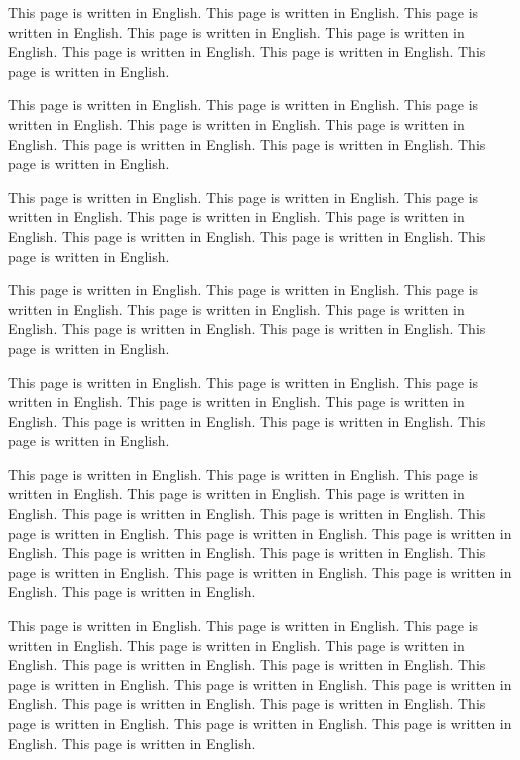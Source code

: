 \documentclass[12pt]{article} %
\begin{document}
This page is written in English. This page is written in English. 
This page is written in English. This page is written in English. 
This page is written in English. This page is written in English. 
This page is written in English. This page is written in English. 

This page is written in English. This page is written in English. 
This page is written in English. This page is written in English. 
This page is written in English. This page is written in English. 
This page is written in English. This page is written in English. 

This page is written in English. This page is written in English. 
This page is written in English. This page is written in English. 
This page is written in English. This page is written in English. 
This page is written in English. This page is written in English. 

This page is written in English. This page is written in English. 
This page is written in English. This page is written in English. 
This page is written in English. This page is written in English. 
This page is written in English. This page is written in English. 

This page is written in English. This page is written in English. 
This page is written in English. This page is written in English. 
This page is written in English. This page is written in English. 
This page is written in English. This page is written in English. 

This page is written in English. This page is written in English. 
This page is written in English. This page is written in English. 
This page is written in English. This page is written in English. 
This page is written in English. This page is written in English. 
This page is written in English. This page is written in English. 
This page is written in English. This page is written in English. 
This page is written in English. This page is written in English. 
This page is written in English. This page is written in English. 

This page is written in English. This page is written in English. 
This page is written in English. This page is written in English. 
This page is written in English. This page is written in English. 
This page is written in English. This page is written in English. 
This page is written in English. This page is written in English. 
This page is written in English. This page is written in English. 
This page is written in English. This page is written in English. 
This page is written in English. This page is written in English. 
\end{document}
